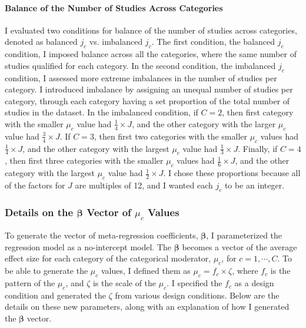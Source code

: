 \paragraph{Balance of the Number of Studies Across Categories} \label{sec: detailsbal}


I evaluated two conditions for balance of the number of studies across categories, denoted as balanced $j_c$ vs. imbalanced $j_c$. The first condition, the balanced $j_c$ condition, I imposed balance across all the categories, where the same number of studies qualified for each category. In the second condition, the imbalanced $j_c$ condition, I assessed more extreme imbalances in the number of studies per category. I introduced imbalance by assigning an unequal number of studies per category, through each category having a set proportion of the total number of studies in the dataset. In the imbalanced condition, if $C = 2$, then first category with the smaller $\mu_c$ value had $\frac{1}{4} \times J$, and the other category  with the larger $\mu_c$ value had $\frac{3}{4} \times J$. If $C = 3$, then first two categories with the smaller $\mu_c$ values had $\frac{1}{4} \times J$, and the other category with the largest $\mu_c$ value had $\frac{1}{3} \times J$. Finally, if $C = 4$, then first three categories with the smaller $\mu_c$ values had $\frac{1}{6} \times J$, and the other category with the largest $\mu_c$ value had $\frac{1}{2} \times J$. I chose these proportions because all of the factors for $J$ are multiples of 12, and I wanted each $j_c$ to be an integer. 

\subsubsection{Details on the $\bm{\beta}$ Vector of $\mu_c$ Values}

To generate the vector of meta-regression coefficients, $\bm{\beta}$, I parameterized the regression model as a no-intercept model. The $\bm{\beta}$ becomes a vector of the average effect size for each category of the categorical moderator, $\mu_c$, for $c = 1, \cdots, C$. To be able to generate the $\mu_c$ values, I defined them as $\mu_c = f_c \times \zeta$,  where $f_c$ is the pattern of the $\mu_c$, and $\zeta$ is the scale of the $\mu_c$. I specified the $f_c$ as a design condition and generated the $\zeta$ from various design conditions. Below are the details on these new parameters, along with an explanation of how I generated the $\bm{\beta}$ vector.

